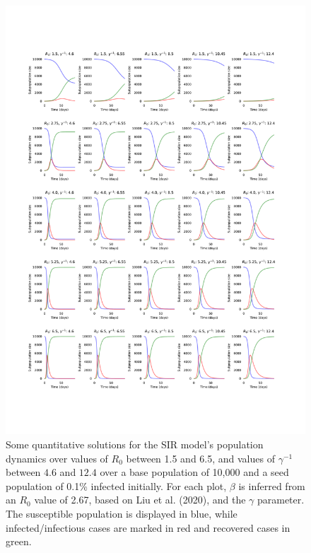 \documentclass{article}
\begin{document}
\begin{figure}
	\includegraphics[width=\linewidth]{figures/fig1-odes}
	\caption{Some quantitative solutions for the SIR model's population dynamics over values of $R_0$ between 1.5 and 6.5, and values of $\gamma^{-1}$ between $4.6$ and $12.4$ over a base population of 10,000 and a seed population of 0.1\% infected initially. For each plot, $\beta$ is inferred from an $R_0$ value of 2.67, based on Liu et al. (2020),\cite{liu2020reproductive} and the $\gamma$ parameter. The susceptible population is displayed in blue, while infected/infectious cases are marked in red and recovered cases in green.}
	\label{fig:ode_solutions}
\end{figure}
\end{document}
